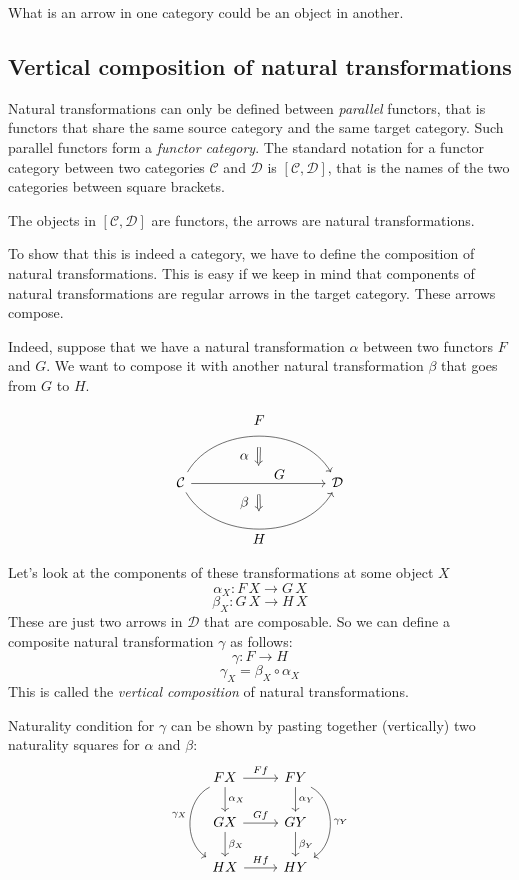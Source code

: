 \documentclass[DaoFP]{subfiles}
\begin{document}
What is an arrow in one category could be an object in another.

\subsection{Vertical composition of natural transformations}

Natural transformations can only be defined between \emph{parallel} functors, that is functors that share the same source category and the same target category. Such parallel functors form a \emph{functor category}. The standard notation for a functor category between two categories $\mathcal{C}$ and $\mathcal{D}$ is $[\mathcal{C}, \mathcal{D}]$, that is the names of the two categories between square brackets.

The objects in $[\mathcal{C}, \mathcal{D}]$ are functors, the arrows are natural transformations. 

To show that this is indeed a category, we have to define the composition of natural transformations. This is easy if we keep in mind that components of natural transformations are regular arrows in the target category. These arrows compose.

Indeed, suppose that we have a natural transformation $\alpha$ between two functors $F$ and $G$. We want to compose it with another natural transformation $\beta$ that goes from $G$ to $H$. 

\[
\begin{tikzcd}[column sep=huge]
\mathcal{C}
  \arrow[bend left=60]{rr}[name=U, label=above:$F$]{}
  \arrow[]{rr}[name=M, label={[xshift=15pt, yshift=-5pt]:$G$}]{} 
  \arrow[bend right=60]{rr}[name=D, label=below:$H$]{} 
 &&
\mathcal{D}
  \arrow[shorten <=8pt, shorten >=8pt,Rightarrow, to path={(U) -- node[label=left:$\alpha$] {} (M)}]{}
  \arrow[shorten <=8pt, shorten >=8pt,Rightarrow, to path={(M) -- node[label=left:$\beta$] {} (D)}]{}
\end{tikzcd}
\]


Let's look at the components of these transformations at some object $X$
\[ \alpha_X \colon F \, X \to G \, X \]
\[ \beta_X \colon G \, X \to H \, X \]
These are just two arrows in $\mathcal{D}$ that are composable. So we can define a composite natural transformation $\gamma$ as follows:
\[ \gamma \colon F \to H\]
\[ \gamma_X = \beta_X \circ \alpha_X \]
 This is called the \emph{vertical composition} of natural transformations.

Naturality condition for $\gamma$ can be shown by pasting together (vertically) two naturality squares for $\alpha$ and $\beta$:
\[
 \begin{tikzcd}
 F X
 \arrow[d, "\alpha_X"]
 \arrow[r, "F f"]
 \arrow[dd, bend right = 60, "\gamma_X"']
 &
F Y
  \arrow[d, "\alpha_Y"]
 \arrow[dd, bend left = 60, "\gamma_Y"]
 \\
G X
 \arrow[r, "G f"]
 \arrow[d, "\beta_X"]
& G Y
\arrow[d, "\beta_Y"]
\\
H X
\arrow[r, "H f"]
& H Y
 \end{tikzcd}
\]
\end{document}
